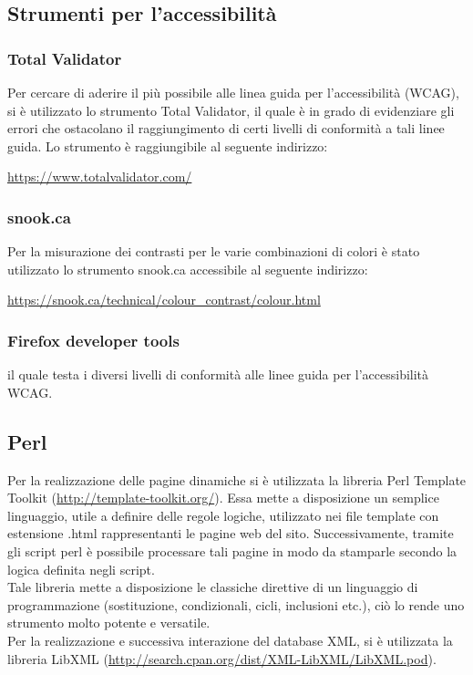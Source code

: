 	\subsection{Strumenti per l'accessibilità}
	
		\subsubsection{Total Validator}
		Per cercare di aderire il più possibile alle linea guida per l'accessibilità (WCAG), si è utilizzato lo strumento Total Validator, il quale è in grado di evidenziare gli errori che ostacolano il raggiungimento di certi livelli di conformità a tali linee guida. Lo strumento è raggiungibile al seguente indirizzo:
		\begin{center}
			\url{https://www.totalvalidator.com/}
		\end{center}
		
		\subsubsection{snook.ca}
		Per la misurazione dei contrasti per le varie combinazioni di colori è stato utilizzato lo strumento snook.ca accessibile al seguente indirizzo:
		\begin{center}
			\url{https://snook.ca/technical/colour_contrast/colour.html}
		\end{center}
		
		\subsubsection{Firefox developer tools}
		
		il quale testa i diversi livelli di conformità alle linee guida per l'accessibilità WCAG.
	
	\subsection{Perl}
	Per la realizzazione delle pagine dinamiche si è utilizzata la libreria Perl Template Toolkit (\url{http://template-toolkit.org/}). Essa mette a disposizione un semplice linguaggio, utile a definire delle regole logiche, utilizzato nei file template con estensione .html rappresentanti le pagine web del sito. Successivamente, tramite gli script perl è possibile processare tali pagine in modo da stamparle secondo la logica definita negli script. \\
	Tale libreria mette a disposizione le classiche direttive di un linguaggio di programmazione (sostituzione, condizionali, cicli, inclusioni etc.), ciò lo rende uno strumento molto potente e versatile. \\
	Per la realizzazione e successiva interazione del database XML, si è utilizzata la libreria LibXML (\url{http://search.cpan.org/dist/XML-LibXML/LibXML.pod}).
